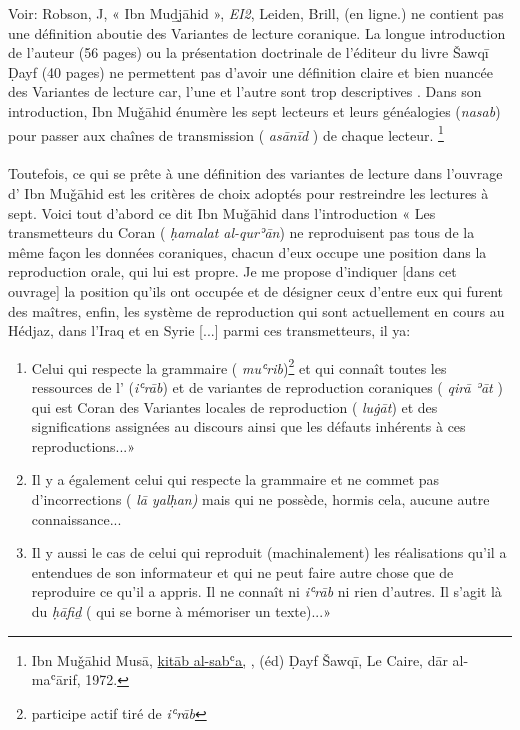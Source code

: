\documentclass[a4paper,12pt]{report}
\begin{document}
\begin{itemize}
{Voir: Robson, J, « Ibn Mud̲j̲āhid », \textit{ EI2}, Leiden, Brill, (en ligne.) }   
ne contient pas une définition aboutie des Variantes de lecture coranique. La longue  introduction de  l'auteur  (56 pages) ou la présentation doctrinale de l'éditeur du livre  Šawq\=i Ḍayf (40 pages)  ne permettent pas d'avoir  une définition claire et bien nuancée des Variantes de lecture car, l'une et l'autre sont trop descriptives .  Dans son introduction,  Ibn Muǧāhid énumère les sept lecteurs et leurs généalogies (\textit{nasab}) pour passer aux chaînes  de transmission ( \textit{asānīd })   de chaque lecteur. 
\footnote{Ibn Muǧāhid Musā, \underline {kitāb al-sabʿa,} , (éd) Ḍayf Šawqī, Le Caire, dār al-maʿārif, 1972.}  

\paragraph{}
Toutefois, ce qui se prête  à une définition  des variantes de lecture dans l'ouvrage d' Ibn Muǧāhid est les critères de choix  adoptés pour restreindre les lectures à sept.  Voici tout d'abord ce  dit Ibn Muǧāhid dans l'introduction  « Les transmetteurs du Coran ( \textit{ḥamalat al-qurʾān}) ne reproduisent pas tous de la même façon les données coraniques, chacun d'eux occupe une position dans la reproduction orale, qui lui est propre. Je me propose d'indiquer [dans cet ouvrage]  la position qu'ils ont occupée et de désigner ceux d'entre eux qui furent des maîtres, enfin, les système de reproduction qui sont actuellement en cours au Hédjaz, dans l'Iraq et en Syrie [...] parmi ces transmetteurs, il ya: 
\begin{enumerate}

    \item  Celui qui respecte la grammaire ( \textit{muʿrib})\footnote{participe actif tiré de \textit{iʿr\=ab} } et qui connaît toutes les ressources de l' 
    (\textit{iʿr\=ab}) et de variantes de reproduction coraniques ( \textit{qirā ʾāt} ) qui est Coran des Variantes locales de reproduction ( \textit{luġāt}) et des significations assignées au discours ainsi que les défauts inhérents à ces reproductions...» 
    \item Il y a également celui qui respecte la grammaire et ne commet pas d'incorrections ( \textit {lā yalḥan)} mais qui ne possède, hormis cela,  aucune autre connaissance...

    \item Il y aussi le cas de celui qui reproduit (machinalement) les réalisations qu'il a entendues de son informateur et qui ne peut faire autre chose que de reproduire ce qu'il a appris. Il ne connaît ni \textit{iʿr\=ab} ni rien d'autres. Il s'agit là du \textit{ḥāfiḏ } ( qui se borne à mémoriser un texte)...»


\end{enumerate}
\end{itemize}
\end{document}
